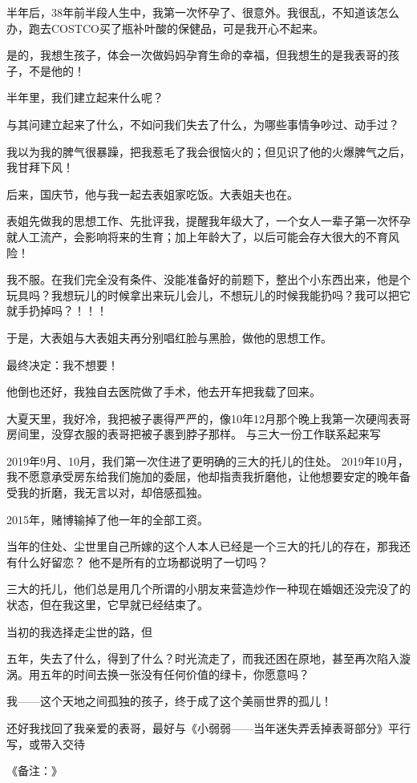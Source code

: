 \documentclass[9pt, b5paper]{article}
\begin{document}
半年后，38年前半段人生中，我第一次怀孕了、很意外。我很乱，不知道该怎么办，跑去COSTCO买了瓶补叶酸的保健品，可是我开心不起来。

是的，我想生孩子，体会一次做妈妈孕育生命的幸福，但我想生的是我表哥的孩子，不是他的！

半年里，我们建立起来什么呢？

与其问建立起来了什么，不如问我们失去了什么，为哪些事情争吵过、动手过？

我以为我的脾气很暴躁，把我惹毛了我会很恼火的；但见识了他的火爆脾气之后，我甘拜下风！

后来，国庆节，他与我一起去表姐家吃饭。大表姐夫也在。

表姐先做我的思想工作、先批评我，提醒我年级大了，一个女人一辈子第一次怀孕就人工流产，会影响将来的生育；加上年龄大了，以后可能会存大很大的不育风险！

我不服。在我们完全没有条件、没能准备好的前题下，整出个小东西出来，他是个玩具吗？我想玩儿的时候拿出来玩儿会儿，不想玩儿的时候我能扔吗？我可以把它就手扔掉吗？！！！

于是，大表姐与大表姐夫再分别唱红脸与黑脸，做他的思想工作。

最终决定：我不想要！

他倒也还好，我独自去医院做了手术，他去开车把我载了回来。

大夏天里，我好冷，我把被子裹得严严的，像10年12月那个晚上我第一次硬闯表哥房间里，没穿衣服的表哥把被子裹到脖子那样。
与三大一份工作联系起来写

2019年9月、10月，我们第一次住进了更明确的三大的托儿的住处。
2019年10月，我不愿意承受房东给我们施加的委屈，他却指责我折磨他，让他想要安定的晚年备受我的折磨，我无言以对，却倍感孤独。

2015年，赌博输掉了他一年的全部工资。


当年的住处、尘世里自己所嫁的这个人本人已经是一个三大的托儿的存在，那我还有什么好留恋？
他不是所有的立场都说明了一切吗？

三大的托儿，他们总是用几个所谓的小朋友来营造炒作一种现在婚姻还没完没了的状态，但在我这里，它早就已经结束了。

当初的我选择走尘世的路，但

五年，失去了什么，得到了什么？时光流走了，而我还困在原地，甚至再次陷入漩涡。用五年的时间去换一张没有任何价值的绿卡，你愿意吗？

我——这个天地之间孤独的孩子，终于成了这个美丽世界的孤儿！

还好我找回了我亲爱的表哥，最好与《小弱弱——当年迷失弄丢掉表哥部分》平行写，或带入交待

《备注：》
\end{document}
